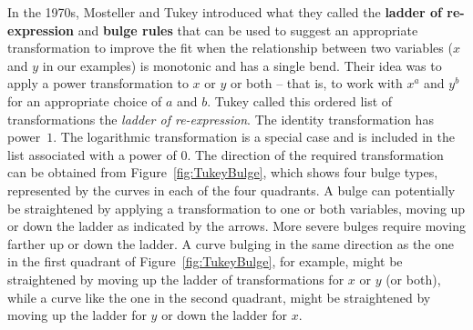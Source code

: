 \documentclass[twoside]{book}\usepackage[]{graphicx}\usepackage[]{xcolor}
\def\term#1{\textbf{#1}}
\newcounter{example}[section]
\begin{document}
In the 1970s, Mosteller and Tukey introduced what they called
the \term{ladder of re-expression} and \term{bulge rules} 
\cite{Tukey:1977:EDA,Mosteller:1977:DataAnalysis} that can be used to 
suggest an appropriate transformation to improve the fit when the 
relationship between two variables ($x$ and $y$ in our examples) 
is monotonic and has a single bend.  
Their idea was to apply a power transformation to 
$x$ or $y$ or both -- that is, to work with $x^a$ and $y^b$ for
an appropriate choice of $a$ and $b$.  Tukey called 
this ordered list of transformations the \emph{ladder of re-expression}.
The identity transformation has power~$1$.
The logarithmic transformation is a special case and is included in the 
list associated with a power of $0$.  
The direction of the required transformation can be obtained
from Figure~\ref{fig:TukeyBulge}, which shows four bulge types,
represented by the curves in each of the four quadrants.  
A bulge can potentially be straightened by 
applying a transformation to one or both variables, moving up 
or down the ladder as indicated by the arrows.  More severe bulges
require moving farther up or down the ladder.  
%
A curve bulging in the 
same direction as the one in the first quadrant of Figure~\ref{fig:TukeyBulge},
for example, might be straightened by moving up the ladder of transformations
for $x$ or $y$ (or both), while a curve like the one in the second quadrant, 
might be straightened by moving up the ladder for $y$ or down the ladder for $x$.
\end{document}
